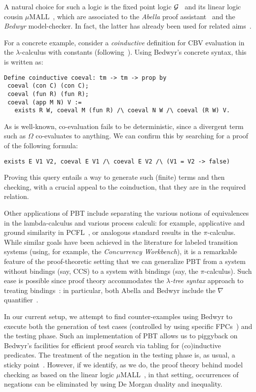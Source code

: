 \documentclass[submission,copyright,creativecommons]{eptcs}
\begin{document}
A natural choice for such a logic is the fixed point logic $\cal
G$~\cite{gacek11ic} %
and its linear logic cousin
$\mu\mathrm{MALL}$~\cite{Baelde12}, which are associated to the
\emph{Abella} proof assistant~\cite{baelde14jfr} and the \emph{Bedwyr}
model-checker.  In fact, the latter has already been used for related
aims~\cite{HeathM15}.

For a concrete example, consider a \emph{coinductive} definition
for CBV evaluation in the $\lambda$-calculus with constants
(following~\cite{2007-Leroy-Grall}). Using Bedwyr's
concrete syntax, this is written as: 
\begin{verbatim}
Define coinductive coeval: tm -> tm -> prop by
 coeval (con C) (con C);
 coeval (fun R) (fun R);
 coeval (app M N) V := 
   exists R W, coeval M (fun R) /\ coeval N W /\ coeval (R W) V.
\end{verbatim}
As is well-known, co-evaluation fails to be deterministic, since a divergent
term such as $\Omega$ co-evaluates to anything.  We can confirm this by
searching for a proof of the following formula:
\begin{verbatim}
exists E V1 V2, coeval E V1 /\ coeval E V2 /\ (V1 = V2 -> false)
\end{verbatim}
Proving this query entails a way to generate such (finite) terms and then checking,
with a crucial appeal to the coinduction, that they are in the required relation.

Other applications of PBT include separating the various
notions of equivalences in the lambda-calculus and various process
calculi: for example,  applicative and ground similarity in
PCFL~\cite{PITobtpe}, or analogous standard results in the
$\pi$-calculus.
%
While similar goals have been achieved in the literature for labeled transition
systems (using, for example, the \emph{Concurrency
  Workbench}), it is a remarkable feature of the proof-theoretic
setting that we can generalize PBT from a system without bindings
(say, CCS) to a system with bindings (say, the $\pi$-calculus).
%
Such ease is possible since proof theory accommodates the
\emph{$\lambda$-tree syntax} approach to treating
bindings~\cite{miller18jar}: in particular, both Abella and Bedwyr
include the $\nabla$ quantifier~\cite{miller05tocl}.

In our current setup, we attempt to find counter-examples using
Bedwyr to execute both the generation of test cases (controlled by
using specific FPCs~\cite{Blanco0M19}) and the testing phase.
%
Such an implementation of PBT allows us to
piggyback on Bedwyr's facilities for efficient proof 
search via tabling for (co)inductive predicates.
%
The treatment of the negation in the testing phase is, as usual, a
sticky point~\cite{Momigliano00}.
%
%
However, if we identify, as we do, the proof theory behind model
checking as based on the linear logic $\mu$MALL~\cite{HeathM19}, in
that setting, occurrences of negations can be eliminated by using De
Morgan duality and inequality.




\end{document}
